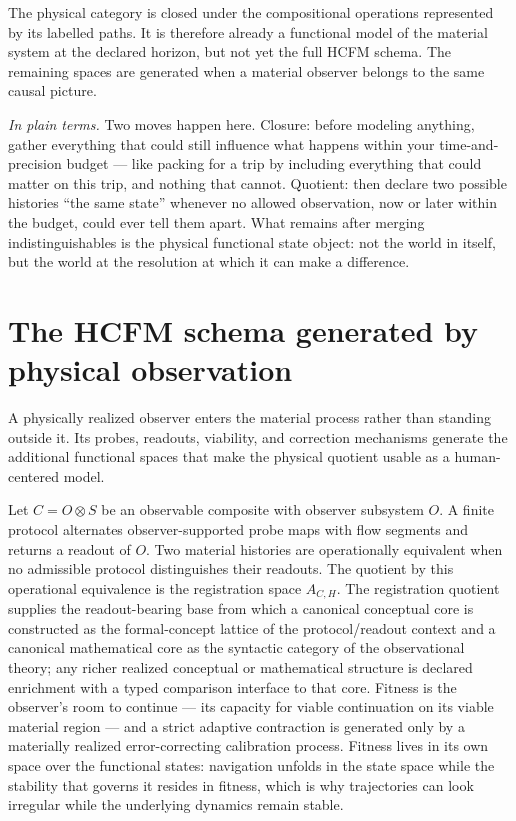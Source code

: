 \documentclass[11pt]{article}
\theoremstyle{definition}
\newcommand{\plainterms}{\emph{In plain terms.}}
\begin{document}
The physical category is closed under the compositional operations represented by its labelled paths. It is therefore already a functional model of the material system at the declared horizon, but not yet the full HCFM schema. The remaining spaces are generated when a material observer belongs to the same causal picture.

\noindent\plainterms{} Two moves happen here. Closure: before modeling anything, gather everything that could still influence what happens within your time-and-precision budget --- like packing for a trip by including everything that could matter on this trip, and nothing that cannot. Quotient: then declare two possible histories ``the same state'' whenever no allowed observation, now or later within the budget, could ever tell them apart. What remains after merging indistinguishables is the physical functional state object: not the world in itself, but the world at the resolution at which it can make a difference.

\section{The HCFM schema generated by physical observation}

A physically realized observer enters the material process rather than standing outside it. Its probes, readouts, viability, and correction mechanisms generate the additional functional spaces that make the physical quotient usable as a human-centered model.

Let $C = O \otimes S$ be an observable composite with observer subsystem $O$. A finite protocol alternates observer-supported probe maps with flow segments and returns a readout of $O$. Two material histories are operationally equivalent when no admissible protocol distinguishes their readouts. The quotient by this operational equivalence is the registration space $A_{C,H}$. The registration quotient supplies the readout-bearing base from which a canonical conceptual core is constructed as the formal-concept lattice of the protocol/readout context and a canonical mathematical core as the syntactic category of the observational theory; any richer realized conceptual or mathematical structure is declared enrichment with a typed comparison interface to that core. Fitness is the observer's room to continue --- its capacity for viable continuation on its viable material region --- and a strict adaptive contraction is generated only by a materially realized error-correcting calibration process. Fitness lives in its own space over the functional states: navigation unfolds in the state space while the stability that governs it resides in fitness, which is why trajectories can look irregular while the underlying dynamics remain stable.
\end{document}
